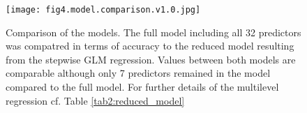 \documentclass[a4paper,oneside,11pt,english]{scrartcl}
\begin{document}
\begin{figure}[h!]
\texttt{[image: fig4.model.comparison.v1.0.jpg]}
\caption{Comparison of the models. The full model including all 32 predictors was compatred in terms of accuracy to the reduced model resulting from the stepwise \textsc{GLM} regression. Values between both models are comparable although only 7 predictors remained in the model compared to the full model. For further details of the multilevel regression cf. Table \ref{tab2:reduced_model}}
\label{fig4:comparison_models}
\end{figure}
\end{document}
